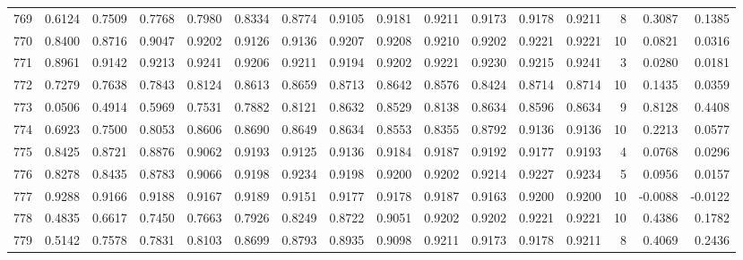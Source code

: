\begin{tabular}{lrrrrrrrrrrrrrrr}
769 &      0.6124 &  0.7509 &  0.7768 &  0.7980 &  0.8334 &  0.8774 &  0.9105 &  0.9181 &  0.9211 &  0.9173 &   0.9178 &     0.9211 &      8 &                    0.3087 &                     0.1385 \\
770 &      0.8400 &  0.8716 &  0.9047 &  0.9202 &  0.9126 &  0.9136 &  0.9207 &  0.9208 &  0.9210 &  0.9202 &   0.9221 &     0.9221 &     10 &                    0.0821 &                     0.0316 \\
771 &      0.8961 &  0.9142 &  0.9213 &  0.9241 &  0.9206 &  0.9211 &  0.9194 &  0.9202 &  0.9221 &  0.9230 &   0.9215 &     0.9241 &      3 &                    0.0280 &                     0.0181 \\
772 &      0.7279 &  0.7638 &  0.7843 &  0.8124 &  0.8613 &  0.8659 &  0.8713 &  0.8642 &  0.8576 &  0.8424 &   0.8714 &     0.8714 &     10 &                    0.1435 &                     0.0359 \\
773 &      0.0506 &  0.4914 &  0.5969 &  0.7531 &  0.7882 &  0.8121 &  0.8632 &  0.8529 &  0.8138 &  0.8634 &   0.8596 &     0.8634 &      9 &                    0.8128 &                     0.4408 \\
774 &      0.6923 &  0.7500 &  0.8053 &  0.8606 &  0.8690 &  0.8649 &  0.8634 &  0.8553 &  0.8355 &  0.8792 &   0.9136 &     0.9136 &     10 &                    0.2213 &                     0.0577 \\
775 &      0.8425 &  0.8721 &  0.8876 &  0.9062 &  0.9193 &  0.9125 &  0.9136 &  0.9184 &  0.9187 &  0.9192 &   0.9177 &     0.9193 &      4 &                    0.0768 &                     0.0296 \\
776 &      0.8278 &  0.8435 &  0.8783 &  0.9066 &  0.9198 &  0.9234 &  0.9198 &  0.9200 &  0.9202 &  0.9214 &   0.9227 &     0.9234 &      5 &                    0.0956 &                     0.0157 \\
777 &      0.9288 &  0.9166 &  0.9188 &  0.9167 &  0.9189 &  0.9151 &  0.9177 &  0.9178 &  0.9187 &  0.9163 &   0.9200 &     0.9200 &     10 &                   -0.0088 &                    -0.0122 \\
778 &      0.4835 &  0.6617 &  0.7450 &  0.7663 &  0.7926 &  0.8249 &  0.8722 &  0.9051 &  0.9202 &  0.9202 &   0.9221 &     0.9221 &     10 &                    0.4386 &                     0.1782 \\
779 &      0.5142 &  0.7578 &  0.7831 &  0.8103 &  0.8699 &  0.8793 &  0.8935 &  0.9098 &  0.9211 &  0.9173 &   0.9178 &     0.9211 &      8 &                    0.4069 &                     0.2436 \\

\end{tabular}
